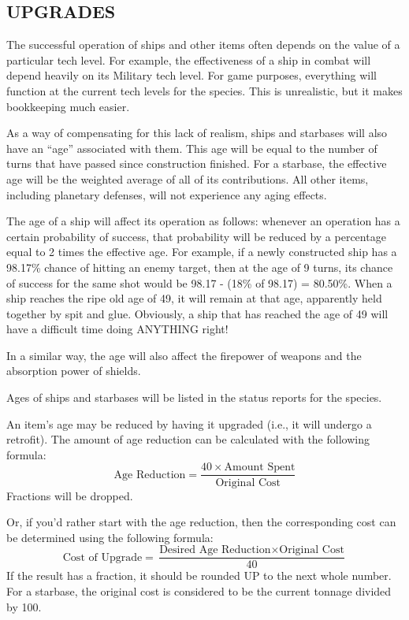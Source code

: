 \documentclass[10pt,titlepage]{article}
\begin{document}
\subsection{UPGRADES}
\label{sec:upgrades}


The successful operation of ships and other items often depends on the value of
a particular tech level.  For example, the effectiveness of a ship in combat
will depend heavily on its Military tech level.  For game purposes, everything
will function at the current tech levels for the species.  This is unrealistic,
but it makes bookkeeping much easier.

As a way of compensating for this lack of realism, ships and starbases will
also have an ``age'' associated with them.  This age will be equal to the number
of turns that have passed since construction finished.  For a starbase, the
effective age will be the weighted average of all of its contributions.  All
other items, including planetary defenses, will not experience any aging
effects.

The age of a ship will affect its operation as follows: whenever an operation
has a certain probability of success, that probability will be reduced by
a percentage equal to 2 times the effective age.  For example, if a newly
constructed ship has a 98.17\% chance of hitting an enemy target, then at the
age of 9 turns, its chance of success for the same shot would be 98.17 - (18\%
of 98.17) = 80.50\%.  When a ship reaches the ripe old age of 49, it will remain
at that age, apparently held together by spit and glue.  Obviously, a ship that
has reached the age of 49 will have a difficult time doing ANYTHING right!

In a similar way, the age will also affect the firepower of weapons and the
absorption power of shields.

Ages of ships and starbases will be listed in the status reports for the
species.

An item's age may be reduced by having it upgraded (i.e., it will undergo a
retrofit).  The amount of age reduction can be calculated with the following
formula:
\[
	\textrm{Age Reduction}  =  \dfrac{40  \times  \textrm{Amount Spent}}{\textrm{Original Cost}}
\]
Fractions will be dropped.

Or, if you'd rather start with the age reduction, then the corresponding cost
can be determined using the following formula:
\[
	\textrm{Cost of Upgrade}  =  \dfrac{\textrm{Desired Age Reduction}  \times  \textrm{Original Cost}}{40}
\]
If the result has a fraction, it should be rounded UP to the next whole number.
For a starbase, the original cost is considered to be the current tonnage
divided by 100.
\end{document}
